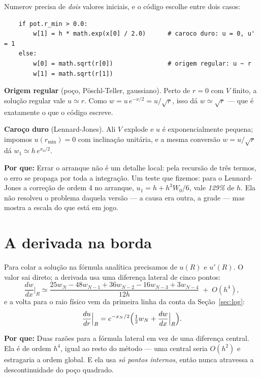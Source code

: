 \documentclass[11pt,a4paper]{article}
\newcommand{\pq}[1]{\medskip\noindent\textbf{Por que:} #1\medskip}
\begin{document}
Numerov precisa de \emph{dois} valores iniciais, e o código escolhe entre dois
casos:

\begin{lstlisting}
    if pot.r_min > 0.0:
        w[1] = h * math.exp(x[0] / 2.0)      # caroco duro: u = 0, u' = 1
    else:
        w[0] = math.sqrt(r[0])               # origem regular: u ~ r
        w[1] = math.sqrt(r[1])
\end{lstlisting}

\textbf{Origem regular} (poço, Pöschl-Teller, gaussiano). Perto de $r=0$ com $V$
finito, a solução regular vale $u \simeq r$. Como $w = u\,e^{-x/2} = u/\sqrt{r}$,
isso dá $w \simeq \sqrt{r}$ --- que é exatamente o que o código escreve.

\textbf{Caroço duro} (Lennard-Jones). Ali $V$ explode e $u$ é exponencialmente
pequena; impomos $u(r_{\min}) = 0$ com inclinação unitária, e a mesma conversão
$w = u/\sqrt{r}$ dá $w_1 \simeq h\,e^{x_0/2}$.

\pq{Errar o arranque não é um detalhe local: pela recursão de três termos, o erro
se propaga por toda a integração. Um teste que fizemos: para o Lennard-Jones a
correção de ordem 4 no arranque, $u_1 = h + h^3W_0/6$, vale \emph{129\%} de $h$.
Ela não resolveu o problema daquela versão --- a causa era outra, a grade --- mas
mostra a escala do que está em jogo.}

\section{A derivada na borda}

Para colar a solução na fórmula analítica precisamos de $u(R)$ e $u'(R)$. O valor
sai direto; a derivada usa uma diferença lateral de cinco pontos:
\begin{equation}
  \frac{dw}{dx}\Big|_{R} \simeq
  \frac{25w_{N} - 48w_{N-1} + 36w_{N-2} - 16w_{N-3} + 3w_{N-4}}{12h}
  \;+\; O(h^4),
\end{equation}
e a volta para o raio físico vem da primeira linha da conta da Seção~\ref{sec:log}:
\begin{equation}
  \frac{du}{dr}\Big|_{R} = e^{-x_N/2}\Bigl(\tfrac12 w_N + \frac{dw}{dx}\Big|_R\Bigr).
\end{equation}

\pq{Duas razões para a fórmula lateral em vez de uma diferença central. Ela é de
ordem $h^4$, igual ao resto do método --- uma central seria $O(h^2)$ e
estragaria a ordem global. E ela usa \emph{só pontos internos}, então nunca
atravessa a descontinuidade do poço quadrado.}
\end{document}
